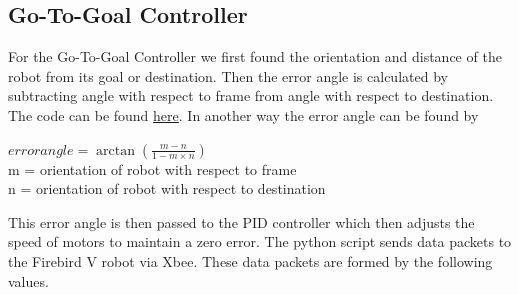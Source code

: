 \documentclass[a4paper,12pt,oneside]{book}
\begin{document}
\subsection*{Go-To-Goal Controller}
For the Go-To-Goal Controller we first found the orientation and distance of the robot from its goal or destination. Then the error angle is calculated by subtracting angle with respect to frame from angle with respect to destination. The code can be found \href{https://github.com/eYSIP-2018/Jigsaw_Puzzle_Solver_using_Multiple_Robots/blob/master/Scripts/Aruco_pose_with_other_point.py}{here}. In another way the error angle can be found by
\begin{center}
$error angle = \arctan \left (\frac{m - n}{1 - m\times n}\right)$\\
m = orientation of robot with respect to frame\\
\hspace{2.7 em}n = orientation of robot with respect to destination\end{center}
This error angle is then passed to the PID controller which then adjusts the speed of motors to maintain a zero error. The python script sends data packets to the Firebird V robot via Xbee. These data packets are formed by the following values.
\end{document}
